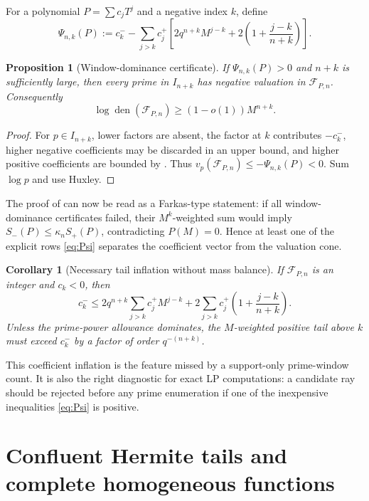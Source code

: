 \documentclass[11pt,oneside]{article}
\newtheorem{proposition}[theorem]{Proposition}
\newtheorem{corollary}[theorem]{Corollary}
\theoremstyle{definition}
\theoremstyle{remark}
\newcommand{\vp}[2]{v_{#1}\!\left(#2\right)}
\newcommand{\den}{\operatorname{den}}
\newcommand{\FF}{\mathcal F}
\begin{document}
For a polynomial $P=\sum c_jT^j$ and a negative index $k$, define
\begin{equation}
 \Psi_{n,k}(P):=c_k^--
 \sum_{j>k}c_j^+
 \left[2q^{n+k}M^{j-k}+2\left(1+\frac{j-k}{n+k}\right)\right].           \label{eq:Psi}
\end{equation}

\begin{proposition}[Window-dominance certificate]
\label{prop:window-dominance}
If $\Psi_{n,k}(P)>0$ and $n+k$ is sufficiently large, then every prime in $I_{n+k}$ has
negative valuation in $\FF_{P,n}$.  Consequently
\[
 \log\den(\FF_{P,n})\ge(1-o(1))M^{n+k}.
\]
\end{proposition}

\begin{proof}
For $p\in I_{n+k}$, lower factors are absent, the factor at $k$ contributes $-c_k^-$, higher
negative coefficients may be discarded in an upper bound, and higher positive coefficients
are bounded by .  Thus
$\vp p{\FF_{P,n}}\le-\Psi_{n,k}(P)<0$.  Sum $\log p$ and use Huxley.
\end{proof}

The proof of  can now be read as a Farkas-type statement: if all
window-dominance certificates failed, their $M^k$-weighted sum would imply
$S_-(P)\le\kappa_nS_+(P)$, contradicting $P(M)=0$.  Hence at least one of the explicit rows
\eqref{eq:Psi} separates the coefficient vector from the valuation cone.

\begin{corollary}[Necessary tail inflation without mass balance]
\label{cor:tail-inflation}
If $\FF_{P,n}$ is an integer and $c_k<0$, then
\[
 c_k^-\le
 2q^{n+k}\sum_{j>k}c_j^+M^{j-k}
 +2\sum_{j>k}c_j^+\left(1+\frac{j-k}{n+k}\right).
\]
Unless the prime-power allowance dominates, the $M$-weighted positive tail above $k$ must
exceed $c_k^-$ by a factor of order $q^{-(n+k)}$.
\end{corollary}

This coefficient inflation is the feature missed by a support-only prime-window count.  It is
also the right diagnostic for exact LP computations: a candidate ray should be rejected
before any prime enumeration if one of the inexpensive inequalities \eqref{eq:Psi} is
positive.

\section{Confluent Hermite tails and complete homogeneous functions}
\label{sec:hermite}
\end{document}
